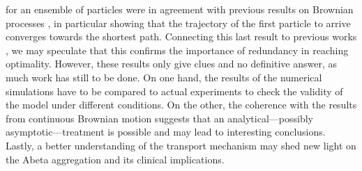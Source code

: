for an ensemble of particles were in agreement with previous results on Brownian processes \cite{basnayake2018,basnayake2017}, in particular showing that the trajectory of the first particle to arrive converges towards the shortest path. Connecting this last result to previous works \cite{reynaud2015, schuss2017}, we may speculate that this confirms the importance of redundancy in reaching optimality.
However, these results only give clues and no definitive answer, as much work has still to be done. On one hand, the results of the numerical simulations have to be compared to actual experiments to check the validity of the model under different conditions. On the other, the coherence with the results from continuous Brownian motion suggests that an analytical—possibly asymptotic—treatment is possible and may lead to interesting conclusions. Lastly, a better understanding of the  transport mechanism may shed new light on the Abeta aggregation and its clinical implications.
